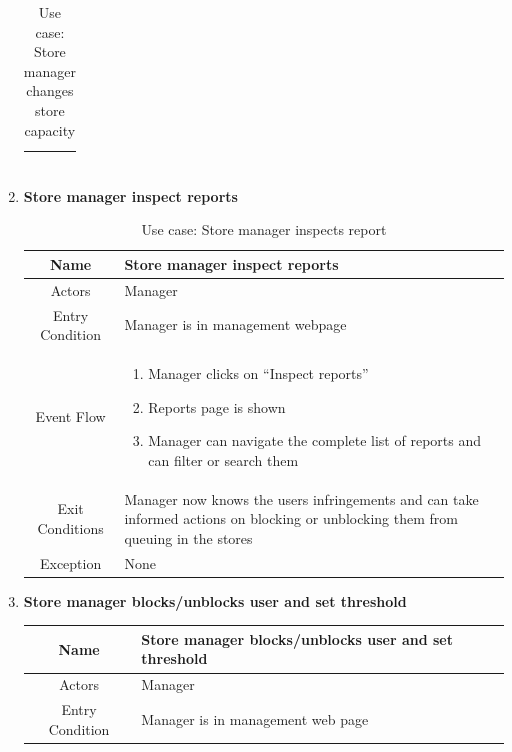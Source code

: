 \begin{enumerate}
\begin{table}[H]
{\begin{tabular}{|c|p{14cm}|}
\begin{enumerate}
			\end{enumerate}\\
			
			\hline
		\end{tabular}
	}
	\label{tab:UCManCap}
	\caption{Use case: Store manager changes store capacity}
\end{table}

\item \textbf{Store manager inspect reports}

\begin{table}[H]
	{
		\begin{tabular}{|c|p{14cm}|}
			\hline
			Name & Store manager inspect reports\\
			\hline
			Actors & Manager\\
			\hline
			Entry Condition & Manager is in management webpage\\
			\hline
			
			Event Flow & \begin{enumerate}
				\item Manager clicks on “Inspect reports”
				\item Reports page is shown
				\item Manager can navigate the complete list of reports and can filter or search them 
				
			\end{enumerate}\\
			
			\hline
			Exit Conditions & Manager now knows the users infringements and can take informed actions on blocking or unblocking them from queuing in the stores\\
			\hline
			
			Exception & None \\
			
			\hline
		\end{tabular}
	}
	\label{tab:UCManReport}
	\caption{Use case: Store manager inspects report}
\end{table}

\item \textbf{Store manager blocks/unblocks user and set threshold}

\begin{table}[H]
	{
		\begin{tabular}{|c|p{14cm}|}
			\hline
			Name & Store manager blocks/unblocks user and set threshold\\
			\hline
			Actors & Manager\\
			\hline
			Entry Condition & Manager is in management web page \\
			\hline
			

\end{tabular}}
\end{table}
\end{enumerate}
